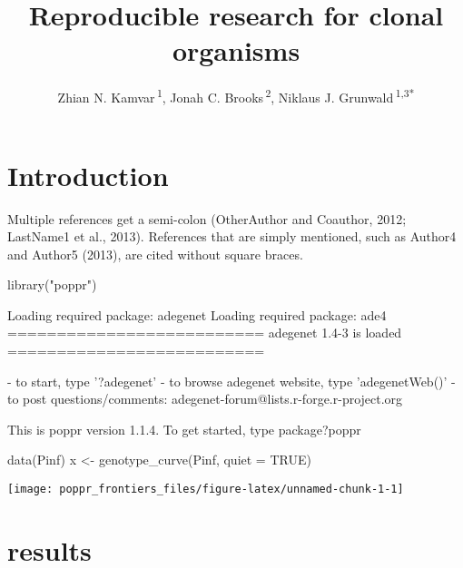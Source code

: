 \documentclass{frontiersSCNS} %
\newenvironment{CodeChunk}{}{}
\def\Authors{
  Zhian N. Kamvar\,\textsuperscript{1},
  Jonah C. Brooks\,\textsuperscript{2},
  Niklaus J. Grunwald\,\textsuperscript{1,3*}}
\def\firstAuthorLast{Kamvar {et~al.}}
\begin{document}
\onecolumn
{}

\title[Reproducible clones]{Reproducible research for clonal organisms}
\author[\firstAuthorLast]{\Authors}
\address{}
\correspondance{}
\extraAuth{}%
\topic{}%
\maketitle

\section*{Introduction}\label{introduction}

Multiple references get a semi-colon (OtherAuthor and Coauthor, 2012;
LastName1 et al., 2013). References that are simply mentioned, such as
Author4 and Author5 (2013), are cited without square braces.

\begin{CodeChunk}
\begin{CodeInput}
library("poppr")
\end{CodeInput}
\begin{CodeOutput}
Loading required package: adegenet
Loading required package: ade4
   ==========================
    adegenet 1.4-3 is loaded
   ==========================

 - to start, type '?adegenet'
 - to browse adegenet website, type 'adegenetWeb()'
 - to post questions/comments: adegenet-forum@lists.r-forge.r-project.org


This is poppr version 1.1.4. To get started, type package?poppr
\end{CodeOutput}
\begin{CodeInput}
data(Pinf)
x <- genotype_curve(Pinf, quiet = TRUE)
\end{CodeInput}

\texttt{[image: poppr\_frontiers\_files/figure-latex/unnamed-chunk-1-1]} \end{CodeChunk}

\section*{results}\label{results}
\end{document}
